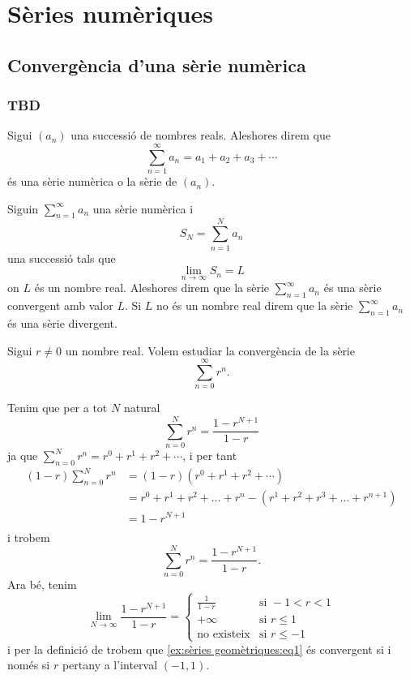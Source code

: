 \documentclass[../Apunts.tex]{subfiles}
\begin{document}
\chapter{Sèries numèriques}
	\section{Convergència d'una sèrie numèrica}
	\subsection{TBD}
	\begin{definition}
		\label{def:sèrie numèrica}
		Sigui \((a_{n})\) una successió de nombres reals. Aleshores direm que
		\[\sum_{n=1}^{\infty}a_{n}=a_{1}+a_{2}+a_{3}+\cdots\]
		és una sèrie numèrica o la sèrie de \((a_{n})\).
	\end{definition}
	\begin{definition}
		\label{def:sèrie convergent}
		\label{def:sèrie divergent}
		Siguin \(\sum_{n=1}^{\infty}a_{n}\) una sèrie numèrica i
		\[S_{N}=\sum_{n=1}^{N}a_{n}\]
		una successió tals que
		\[\lim_{n\to\infty}S_{n}=L\]
		on \(L\) és un nombre real. Aleshores direm que la sèrie \(\sum_{n=1}^{\infty}a_{n}\) és una sèrie convergent amb valor \(L\). Si \(L\) no és un nombre real direm que la sèrie \(\sum_{n=1}^{\infty}a_{n}\) és una sèrie divergent.
	\end{definition}
	\begin{example}
		\label{ex:sèries geomètriques}
		Sigui \(r\neq0\) un nombre real. Volem estudiar la convergència de la sèrie
		\[\sum_{n=0}^{\infty}r^{n}.\]
		\begin{solution}
			Tenim que per a tot \(N\) natural
			\begin{equation}
				\label{ex:sèries geomètriques:eq1}
				\sum_{n=0}^{N}r^{n}=\frac{1-r^{N+1}}{1-r}
			\end{equation}
			ja que \(\sum_{n=0}^{N}r^{n}=r^{0}+r^{1}+r^{2}+\cdots\), i per tant
			\begin{align*}
				(1-r)\sum_{n=0}^{N}r^{n}&=(1-r)(r^{0}+r^{1}+r^{2}+\cdots)\\
				&=r^{0}+r^{1}+r^{2}+\dots+r^{n}-(r^{1}+r^{2}+r^{3}+\dots+r^{n+1})\\
				&=1-r^{N+1}\\
			\end{align*}
			i trobem
			\[\sum_{n=0}^{N}r^{n}=\frac{1-r^{N+1}}{1-r}.\]
			Ara bé, tenim
			\[\lim_{N\to\infty}\frac{1-r^{N+1}}{1-r}=
			\begin{cases}
				\displaystyle \frac{1}{1-r} & \text{si }-1<r<1 \\
				+\infty & \text{si }r\leq1 \\
				\text{no existeix} & \text{si }r\leq-1 
			\end{cases}\]
			i per la definició de  trobem que \eqref{ex:sèries geomètriques:eq1} és convergent si i només si \(r\) pertany a l'interval \((-1,1)\).
		\end{solution}
	\end{example}
\end{document}
